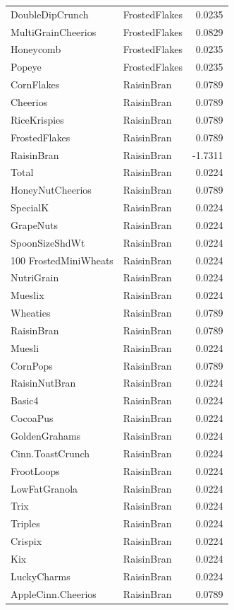 \begin{longtable}{llr}
DoubleDipCrunch & FrostedFlakes & 0.0235 \\
MultiGrainCheerios & FrostedFlakes & 0.0829 \\
Honeycomb & FrostedFlakes & 0.0235 \\
Popeye & FrostedFlakes & 0.0235 \\
CornFlakes & RaisinBran & 0.0789 \\
Cheerios & RaisinBran & 0.0789 \\
RiceKrispies & RaisinBran & 0.0789 \\
FrostedFlakes & RaisinBran & 0.0789 \\
RaisinBran & RaisinBran & -1.7311 \\
Total & RaisinBran & 0.0224 \\
HoneyNutCheerios & RaisinBran & 0.0789 \\
SpecialK & RaisinBran & 0.0224 \\
GrapeNuts & RaisinBran & 0.0224 \\
SpoonSizeShdWt & RaisinBran & 0.0224 \\
100%
FrostedMiniWheats & RaisinBran & 0.0224 \\
NutriGrain & RaisinBran & 0.0224 \\
Mueslix & RaisinBran & 0.0224 \\
Wheaties & RaisinBran & 0.0789 \\
RaisinBran & RaisinBran & 0.0789 \\
Muesli & RaisinBran & 0.0224 \\
CornPops & RaisinBran & 0.0789 \\
RaisinNutBran & RaisinBran & 0.0224 \\
Basic4 & RaisinBran & 0.0224 \\
CocoaPus & RaisinBran & 0.0224 \\
GoldenGrahams & RaisinBran & 0.0224 \\
Cinn.ToastCrunch & RaisinBran & 0.0224 \\
FrootLoops & RaisinBran & 0.0224 \\
LowFatGranola & RaisinBran & 0.0224 \\
Trix & RaisinBran & 0.0224 \\
Triples & RaisinBran & 0.0224 \\
Crispix & RaisinBran & 0.0224 \\
Kix & RaisinBran & 0.0224 \\
LuckyCharms & RaisinBran & 0.0224 \\
AppleCinn.Cheerios & RaisinBran & 0.0789 \\

\end{longtable}

